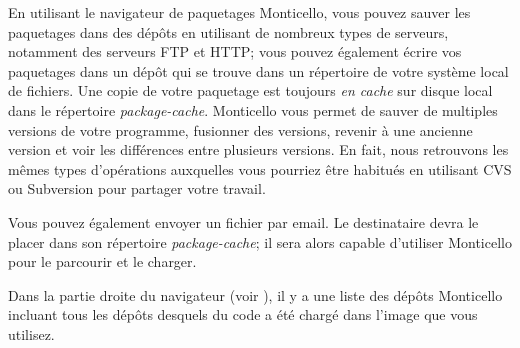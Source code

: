 \documentclass[a4paper,10pt,twoside]{book}
\begin{document}
En utilisant le navigateur de paquetages Monticello, vous pouvez sauver les paquetages dans des dépôts en utilisant de nombreux types de serveurs, notamment des serveurs FTP et HTTP; vous pouvez également écrire vos paquetages dans un dépôt qui se trouve dans un répertoire de votre système local de fichiers.
Une copie de votre paquetage est toujours \emph{en cache} sur disque local dans le répertoire \emph{package-cache}. 
Monticello vous permet de sauver de multiples versions de votre programme, fusionner des versions, revenir à une ancienne version et voir les différences entre plusieurs versions.
En fait, nous retrouvons les mêmes types d'opérations auxquelles vous
pourriez \^etre habitu\'es en utilisant CVS ou Subversion pour
partager votre travail.


Vous pouvez également envoyer un fichier  par email.
Le destinataire devra le placer dans son répertoire \emph{package-cache}; il sera alors capable d'utiliser Monticello pour le parcourir et le charger. 

Dans la partie droite du navigateur (voir ), il y a une liste des dépôts Monticello incluant tous les dépôts desquels du code a été chargé dans l'image que vous utilisez. 
\end{document}
